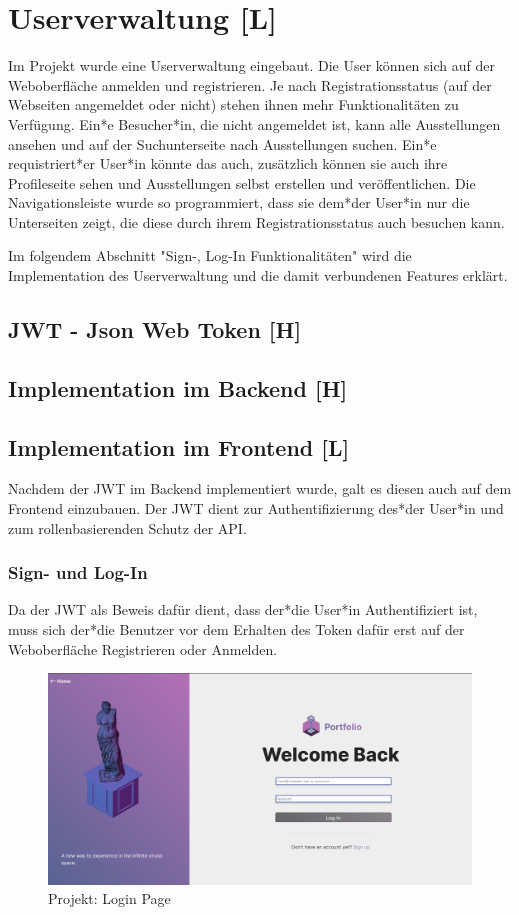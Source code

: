 \section{Userverwaltung [L]}
Im Projekt wurde eine Userverwaltung eingebaut. Die User können sich auf der Weboberfläche anmelden und registrieren. Je nach Registrationsstatus (auf der Webseiten angemeldet oder nicht) stehen ihnen mehr Funktionalitäten zu Verfügung. Ein*e Besucher*in, die nicht angemeldet ist, kann alle Ausstellungen ansehen und auf der Suchunterseite nach Ausstellungen suchen. Ein*e requistriert*er User*in könnte das auch, zusätzlich können sie auch ihre Profileseite sehen und Ausstellungen selbst erstellen und veröffentlichen. Die Navigationsleiste wurde so programmiert, dass sie dem*der User*in nur die Unterseiten zeigt, die diese durch ihrem Registrationsstatus auch besuchen kann. 

Im folgendem Abschnitt "Sign-, Log-In Funktionalitäten" wird die Implementation des Userverwaltung und die damit verbundenen Features erklärt. 

\subsection{JWT - Json Web Token [H]}
\subsection{Implementation im Backend [H]}
\subsection{Implementation im Frontend [L]}
Nachdem der JWT im Backend implementiert wurde, galt es diesen auch auf dem Frontend einzubauen. Der JWT dient zur Authentifizierung des*der User*in und zum rollenbasierenden Schutz der API. 

\subsubsection{Sign- und Log-In}
Da der JWT als Beweis dafür dient, dass der*die User*in Authentifiziert ist, muss sich der*die Benutzer vor dem Erhalten des Token dafür erst auf der Weboberfläche Registrieren oder Anmelden. 

\begin{figure}
    \centering
    \includegraphics[scale=0.25]{pics/GalleryLogIn.png}
    \caption{Projekt: Login Page}
    \label{fig:impl:login}
\end{figure}


